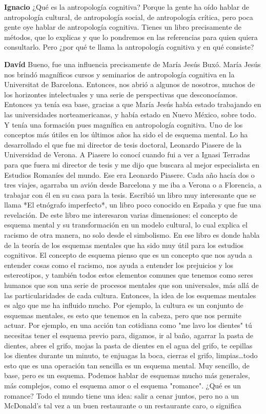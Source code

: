 \documentclass[
  spanish,
  11pt,
  a4paper,
]{scrbook}
\newenvironment{transcripcion}{
    \begin{list}{}{
        \setlength{\leftmargin}{1.5em}  %
        \setlength{\rightmargin}{0em}
        \setlength{\itemsep}{0.2em}     %
        \setlength{\parsep}{0.0em}
        \setlength{\listparindent}{0pt}
    }
}{
    \end{list}
}
\newcommand{\personaje}[1]{\textbf{#1}\quad}
\begin{document}
\begin{transcripcion}
\item \personaje{Ignacio} ¿Qué es la antropología cognitiva? Porque la gente ha oído hablar de antropología cultural, de antropología social, de antropología crítica, pero poca gente oye hablar de antropología cognitiva. Tienes un libro precisamente de métodos, que lo explicas y que lo pondremos en las referencias para quien quiera consultarlo. Pero ¿por qué te llama la antropología cognitiva y en qué consiste?

\item \personaje{Davíd} Bueno, fue una influencia precisamente de María Jesús Buxó. María Jesús nos brindó magníficos cursos y seminarios de antropología cognitiva en la Universitat de Barcelona. Entonces, nos abrió a algunos de nosotros, muchos de los horizontes intelectuales y una serie de perspectivas que desconocíamos. Entonces ya tenía esa base, gracias a que María Jesús había estado trabajando en las universidades norteamericanas, y había estado en Nuevo México, sobre todo. Y tenía una formación pues magnífica en antropología cognitiva. Uno de los conceptos más útiles en los últimos años ha sido el de esquema mental. Lo ha desarrollado el que fue mi director de tesis doctoral, Leonardo Piasere de la Universidad de Verona. A Piasere lo conocí cuando fui a ver a Ignasi Terradas para que fuera mi director de tesis y me dijo que buscara al mejor especialista en Estudios Romaníes del mundo. Ese era Leonardo Piasere. Cada año hacía dos o tres viajes, agarraba un avión desde Barcelona y me iba a Verona o a Florencia, a trabajar con él en su casa para la tesis. Escribió un libro muy interesante que se llama *El etnógrafo imperfecto*, un libro poco conocido en España y que fue una revelación. De este libro me interesaron varias dimensiones: el concepto de esquema mental y su transformación en un modelo cultural, lo cual explica el racismo de otra manera, no solo desde el simbolismo. En ese libro es donde habla de la teoría de los esquemas mentales que ha sido muy útil para los estudios cognitivos. El concepto de esquema pienso que es un concepto que nos ayuda a entender cosas como el racismo, nos ayuda a entender los prejuicios y los estereotipos, y también todos estos elementos comunes que tenemos como seres humanos que son una serie de procesos mentales que son universales, más allá de las particularidades de cada cultura. Entonces, la idea de los esquemas mentales es algo que me ha influido mucho. Por ejemplo, la cultura es un conjunto de esquemas mentales, es esto que tenemos en la cabeza, pero que nos permite actuar. Por ejemplo, en una acción tan cotidiana como "me lavo los dientes" tú necesitas tener el esquema previo para, digamos, ir al baño, agarrar la pasta de dientes, abres el grifo, mojas la pasta de dientes en el agua del grifo, te cepillas los dientes durante un minuto, te enjuagas la boca, cierras el grifo, limpias\dots todo esto que es una operación tan sencilla es un esquema mental. Muy sencillo, de base, pero es un esquema. Podemos hablar de esquemas mucho más generales, más complejos, como el esquema amor o el esquema "romance". ¿Qué es un romance? Todo el mundo tiene una idea: salir a cenar juntos, pero no a un McDonald's tal vez a un buen restaurante o un restaurante caro, o significa 
\end{transcripcion}
\end{document}
